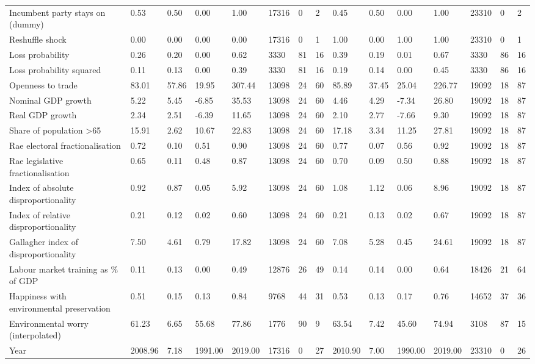 \begin{longtable}{lllllllllllllll}
Incumbent party stays on (dummy) & 0.53 & 0.50 & 0.00 & 1.00 & 17316 & 0 & 2 & 0.45 & 0.50 & 0.00 & 1.00 & 23310 & 0 & 2\\
Reshuffle shock & 0.00 & 0.00 & 0.00 & 0.00 & 17316 & 0 & 1 & 1.00 & 0.00 & 1.00 & 1.00 & 23310 & 0 & 1\\
\addlinespace
Loss probability & 0.26 & 0.20 & 0.00 & 0.62 & 3330 & 81 & 16 & 0.39 & 0.19 & 0.01 & 0.67 & 3330 & 86 & 16\\
Loss probability squared & 0.11 & 0.13 & 0.00 & 0.39 & 3330 & 81 & 16 & 0.19 & 0.14 & 0.00 & 0.45 & 3330 & 86 & 16\\
Openness to trade & 83.01 & 57.86 & 19.95 & 307.44 & 13098 & 24 & 60 & 85.89 & 37.45 & 25.04 & 226.77 & 19092 & 18 & 87\\
Nominal GDP growth & 5.22 & 5.45 & -6.85 & 35.53 & 13098 & 24 & 60 & 4.46 & 4.29 & -7.34 & 26.80 & 19092 & 18 & 87\\
Real GDP growth & 2.34 & 2.51 & -6.39 & 11.65 & 13098 & 24 & 60 & 2.10 & 2.77 & -7.66 & 9.30 & 19092 & 18 & 87\\
\addlinespace
Share of population >65 & 15.91 & 2.62 & 10.67 & 22.83 & 13098 & 24 & 60 & 17.18 & 3.34 & 11.25 & 27.81 & 19092 & 18 & 87\\
Rae electoral fractionalisation & 0.72 & 0.10 & 0.51 & 0.90 & 13098 & 24 & 60 & 0.77 & 0.07 & 0.56 & 0.92 & 19092 & 18 & 87\\
Rae legislative fractionalisation & 0.65 & 0.11 & 0.48 & 0.87 & 13098 & 24 & 60 & 0.70 & 0.09 & 0.50 & 0.88 & 19092 & 18 & 87\\
Index of absolute disproportionality & 0.92 & 0.87 & 0.05 & 5.92 & 13098 & 24 & 60 & 1.08 & 1.12 & 0.06 & 8.96 & 19092 & 18 & 87\\
Index of relative disproportionality & 0.21 & 0.12 & 0.02 & 0.60 & 13098 & 24 & 60 & 0.21 & 0.13 & 0.02 & 0.67 & 19092 & 18 & 87\\
\addlinespace
Gallagher index of disproportionality & 7.50 & 4.61 & 0.79 & 17.82 & 13098 & 24 & 60 & 7.08 & 5.28 & 0.45 & 24.61 & 19092 & 18 & 87\\
Labour market training as \% of GDP & 0.11 & 0.13 & 0.00 & 0.49 & 12876 & 26 & 49 & 0.14 & 0.14 & 0.00 & 0.64 & 18426 & 21 & 64\\
Happiness with environmental preservation & 0.51 & 0.15 & 0.13 & 0.84 & 9768 & 44 & 31 & 0.53 & 0.13 & 0.17 & 0.76 & 14652 & 37 & 36\\
Environmental worry (interpolated) & 61.23 & 6.65 & 55.68 & 77.86 & 1776 & 90 & 9 & 63.54 & 7.42 & 45.60 & 74.94 & 3108 & 87 & 15\\
Year & 2008.96 & 7.18 & 1991.00 & 2019.00 & 17316 & 0 & 27 & 2010.90 & 7.00 & 1990.00 & 2019.00 & 23310 & 0 & 26\\
\bottomrule
\end{longtable}
